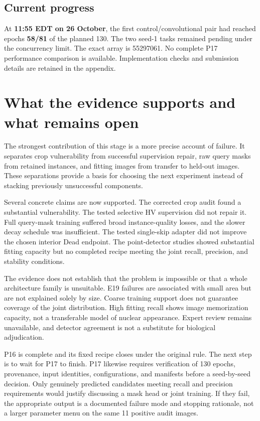 \documentclass[11pt,a4paper]{article}
\begin{document}
\subsection{Current progress}

At \textbf{11:55 EDT on 26 October}, the first control/convolutional pair had reached epochs \textbf{58/81} of the planned 130. The two seed-1 tasks remained pending under the concurrency limit. The exact array is 55297061. No complete P17 performance comparison is available. Implementation checks and submission details are retained in the appendix.

\section{What the evidence supports and what remains open}

The strongest contribution of this stage is a more precise account of failure. It separates crop vulnerability from successful supervision repair, raw query masks from retained instances, and fitting images from transfer to held-out images. These separations provide a basis for choosing the next experiment instead of stacking previously unsuccessful components.

Several concrete claims are now supported. The corrected crop audit found a substantial vulnerability. The tested selective HV supervision did not repair it. Full query-mask training suffered broad instance-quality losses, and the slower decay schedule was insufficient. The tested single-skip adapter did not improve the chosen interior Dead endpoint. The point-detector studies showed substantial fitting capacity but no completed recipe meeting the joint recall, precision, and stability conditions.

The evidence does not establish that the problem is impossible or that a whole architecture family is unsuitable. E19 failures are associated with small area but are not explained solely by size. Coarse training support does not guarantee coverage of the joint distribution. High fitting recall shows image memorization capacity, not a transferable model of nuclear appearance. Expert review remains unavailable, and detector agreement is not a substitute for biological adjudication.

P16 is complete and its fixed recipe closes under the original rule. The next step is to wait for P17 to finish. P17 likewise requires verification of 130 epochs, provenance, input identities, configurations, and manifests before a seed-by-seed decision. Only genuinely predicted candidates meeting recall and precision requirements would justify discussing a mask head or joint training. If they fail, the appropriate output is a documented failure mode and stopping rationale, not a larger parameter menu on the same 11 positive audit images.
\end{document}

